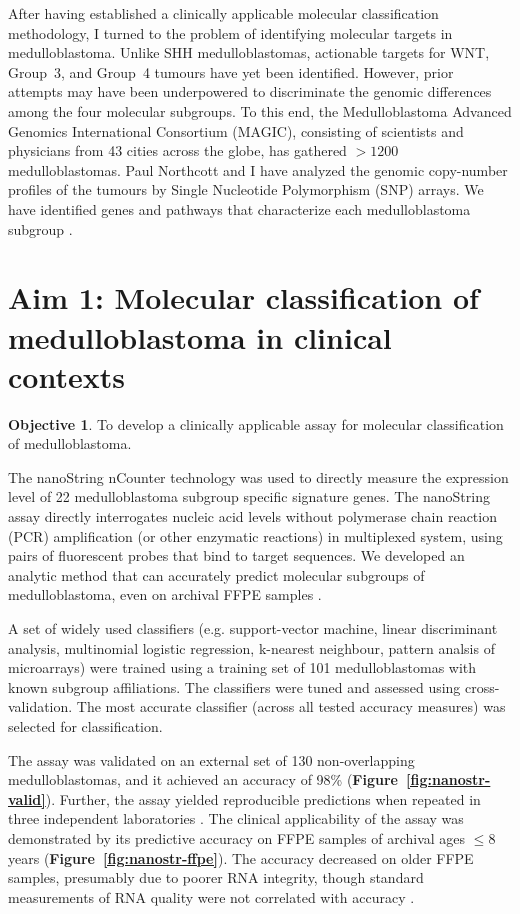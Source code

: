\documentclass[11pt,letterpaper]{article}
\theoremstyle{definition}
\newtheorem*{objective}{Objective}
\begin{document}
After having established a clinically applicable molecular classification methodology, I turned to the problem of identifying molecular targets in medulloblastoma. Unlike SHH medulloblastomas, actionable targets for WNT, Group~3, and Group~4 tumours have yet been identified. However, prior attempts may have been underpowered to discriminate the genomic differences among the four molecular subgroups. To this end, the Medulloblastoma Advanced Genomics International Consortium (MAGIC), consisting of scientists and physicians from 43 cities across the globe, has gathered $>1200$ medulloblastomas. Paul Northcott and I have analyzed the genomic copy-number profiles of the tumours by Single Nucleotide Polymorphism (SNP) arrays. We have identified genes and pathways that characterize each medulloblastoma subgroup .

\section{Aim 1: Molecular classification of medulloblastoma in clinical contexts}

\begin{objective}
To develop a clinically applicable assay for molecular classification of medulloblastoma.
\end{objective}

The nanoString nCounter technology  was used to directly measure the expression level of 22 medulloblastoma subgroup specific signature genes. The nanoString assay directly interrogates nucleic acid levels without polymerase chain reaction (PCR) amplification (or other enzymatic reactions) in multiplexed system, using pairs of fluorescent probes that bind to target sequences. We developed an analytic method that can accurately predict molecular subgroups of medulloblastoma, even on archival FFPE samples .

A set of widely used classifiers (e.g. support-vector machine, linear discriminant analysis, multinomial logistic regression, k-nearest neighbour, pattern analsis of microarrays) were trained using a training set of 101 medulloblastomas with known subgroup affiliations. The classifiers were tuned and assessed using cross-validation. The most accurate classifier (across all tested accuracy measures) was selected for classification.

The assay was validated on an external set of 130 non-overlapping medulloblastomas, and it achieved an accuracy of 98\% (\textbf{Figure~\ref{fig:nanostr-valid}}). Further, the assay yielded reproducible predictions when repeated in three independent laboratories . The clinical applicability of the assay was demonstrated by its predictive accuracy on FFPE samples of archival ages $\leq 8$ years (\textbf{Figure~\ref{fig:nanostr-ffpe}}). The accuracy decreased on older FFPE samples, presumably due to poorer RNA integrity, though standard measurements of RNA quality were not correlated with accuracy .
\end{document}
